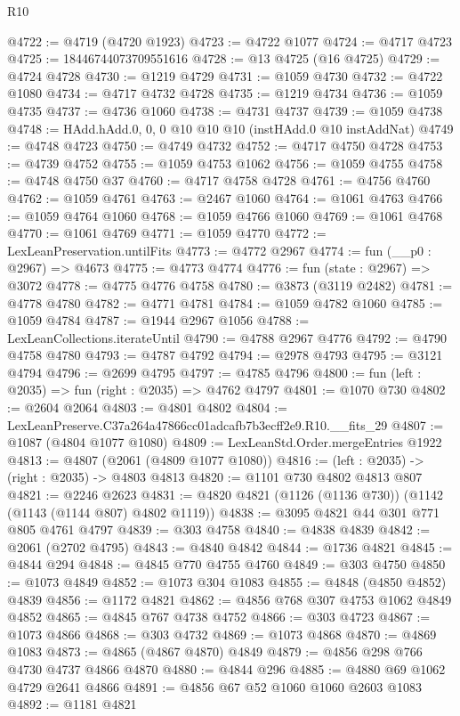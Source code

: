 \begin{lexlean}{R10}
\begin{coremodule}
@4722 := @4719 (@4720 @1923)
@4723 := @4722 @1077
@4724 := @4717 @4723
@4725 := 18446744073709551616
@4728 := @13 @4725 (@16 @4725)
@4729 := @4724 @4728
@4730 := @1219 @4729
@4731 := @1059 @4730
@4732 := @4722 @1080
@4734 := @4717 @4732 @4728
@4735 := @1219 @4734
@4736 := @1059 @4735
@4737 := @4736 @1060
@4738 := @4731 @4737
@4739 := @1059 @4738
@4748 := HAdd.hAdd.{0, 0, 0} @10 @10 @10 (instHAdd.{0} @10 instAddNat)
@4749 := @4748 @4723
@4750 := @4749 @4732
@4752 := @4717 @4750 @4728
@4753 := @4739 @4752
@4755 := @1059 @4753 @1062
@4756 := @1059 @4755
@4758 := @4748 @4750 @37
@4760 := @4717 @4758 @4728
@4761 := @4756 @4760
@4762 := @1059 @4761
@4763 := @2467 @1060
@4764 := @1061 @4763
@4766 := @1059 @4764 @1060
@4768 := @1059 @4766 @1060
@4769 := @1061 @4768
@4770 := @1061 @4769
@4771 := @1059 @4770
@4772 := LexLeanPreservation.untilFits
@4773 := @4772 @2967
@4774 := fun (__p0 : @2967) => @4673
@4775 := @4773 @4774
@4776 := fun (state : @2967) => @3072
@4778 := @4775 @4776 @4758
@4780 := @3873 (@3119 @2482)
@4781 := @4778 @4780
@4782 := @4771 @4781
@4784 := @1059 @4782 @1060
@4785 := @1059 @4784
@4787 := @1944 @2967 @1056
@4788 := LexLeanCollections.iterateUntil
@4790 := @4788 @2967 @4776
@4792 := @4790 @4758 @4780
@4793 := @4787 @4792
@4794 := @2978 @4793
@4795 := @3121 @4794
@4796 := @2699 @4795
@4797 := @4785 @4796
@4800 := fun (left : @2035) => fun (right : @2035) => @4762 @4797
@4801 := @1070 @730
@4802 := @2604 @2064
@4803 := @4801 @4802
@4804 := LexLeanPreserve.C37a264a47866cc01adcafb7b3ecff2e9.R10.__fits_29
@4807 := @1087 (@4804 @1077 @1080)
@4809 := LexLeanStd.Order.mergeEntries @1922
@4813 := @4807 (@2061 (@4809 @1077 @1080))
@4816 := (left : @2035) -> (right : @2035) -> @4803 @4813
@4820 := @1101 @730 @4802 @4813 @807
@4821 := @2246 @2623
@4831 := @4820 @4821 (@1126 (@1136 @730)) (@1142 (@1143 (@1144 @807) @4802 @1119))
@4838 := @3095 @4821 @44 @301 @771 @805 @4761 @4797
@4839 := @303 @4758
@4840 := @4838 @4839
@4842 := @2061 (@2702 @4795)
@4843 := @4840 @4842
@4844 := @1736 @4821
@4845 := @4844 @294
@4848 := @4845 @770 @4755 @4760
@4849 := @303 @4750
@4850 := @1073 @4849
@4852 := @1073 @304 @1083
@4855 := @4848 (@4850 @4852) @4839
@4856 := @1172 @4821
@4862 := @4856 @768 @307 @4753 @1062 @4849 @4852
@4865 := @4845 @767 @4738 @4752
@4866 := @303 @4723
@4867 := @1073 @4866
@4868 := @303 @4732
@4869 := @1073 @4868
@4870 := @4869 @1083
@4873 := @4865 (@4867 @4870) @4849
@4879 := @4856 @298 @766 @4730 @4737 @4866 @4870
@4880 := @4844 @296
@4885 := @4880 @69 @1062 @4729 @2641 @4866
@4891 := @4856 @67 @52 @1060 @1060 @2603 @1083
@4892 := @1181 @4821

\end{coremodule}
\end{lexlean}
